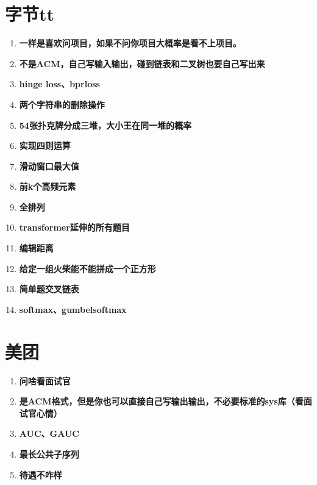 \documentclass{article}
\begin{document}
\section{字节tt}
\begin{enumerate}
\item \textbf{一样是喜欢问项目，如果不问你项目大概率是看不上项目。}\\
\item \textbf{不是ACM，自己写输入输出，碰到链表和二叉树也要自己写出来}\\
\item \textbf{hinge loss、bprloss}\\
\item \textbf{两个字符串的删除操作}\\
\item \textbf{54张扑克牌分成三堆，大小王在同一堆的概率}\\
\item \textbf{实现四则运算}\\
\item \textbf{滑动窗口最大值}\\
\item \textbf{前k个高频元素}\\
\item \textbf{全排列}\\
\item \textbf{transformer延伸的所有题目}\\
\item \textbf{编辑距离}\\
\item \textbf{给定一组火柴能不能拼成一个正方形}\\
\item \textbf{简单题交叉链表}\\
\item \textbf{softmax、gumbelsoftmax}\\
\end{enumerate}

\section{美团}
\begin{enumerate}
\item \textbf{问啥看面试官}\\
\item \textbf{是ACM格式，但是你也可以直接自己写输出输出，不必要标准的sys库（看面试官心情）}\\
\item \textbf{AUC、GAUC}\\
\item \textbf{最长公共子序列}\\
\item \textbf{待遇不咋样}\\
\end{enumerate}
\end{document}

